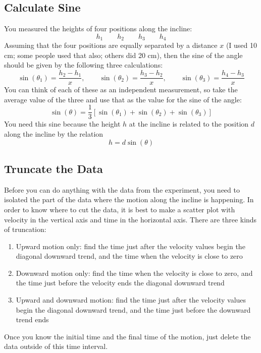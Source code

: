 \subsection{Calculate Sine}
You measured the heights of four positions along the incline:
\begin{equation}
    h_{1} \qquad h_{2} \qquad h_{3} \qquad h_{4}
\end{equation}
Assuming that the four positions are equally separated by a distance $x$ (I used 10 cm; some people used that also; others did 20 cm), then the sine of the angle should be given by the following three calculations:
\begin{equation}
    \sin{(\theta_{1})} = \frac{h_{2} - h_{1}}{x}, \qquad \sin{(\theta_{2})} = \frac{h_{3} - h_{2}}{x}, \qquad \sin{(\theta_{3})} = \frac{h_{4} - h_{3}}{x}
\end{equation}
You can think of each of these as an independent measurement, so take the average value of the three and use that as the value for the sine of the angle:
\begin{equation}
    \sin{(\theta)} = \frac{1}{3} \left[ \sin{(\theta_{1})} + \sin{(\theta_{2})} + \sin{(\theta_{3})} \right]
\end{equation}
You need this sine because the height $h$ at the incline is related to the position $d$ along the incline by the relation
\begin{equation}
    h = d \sin{(\theta)}
\end{equation}
\subsection{Truncate the Data}
Before you can do anything with the data from the experiment, you need to isolated the part of the data where the motion along the incline is happening. In order to know where to cut the data, it is best to make a scatter plot with velocity in the vertical axis and time in the horizontal axis. There are three kinds of truncation:
\begin{enumerate}
    \item Upward motion only: find the time just after the velocity values begin the diagonal downward trend, and the time when the velocity is close to zero
    \item Downward motion only: find the time when the velocity is close to zero, and the time just before the velocity ends the diagonal downward trend
    \item Upward and downward motion: find the time just after the velocity values begin the diagonal downward trend, and the time just before the downward trend ends
\end{enumerate}
Once you know the initial time and the final time of the motion, just delete the data outside of this time interval.

